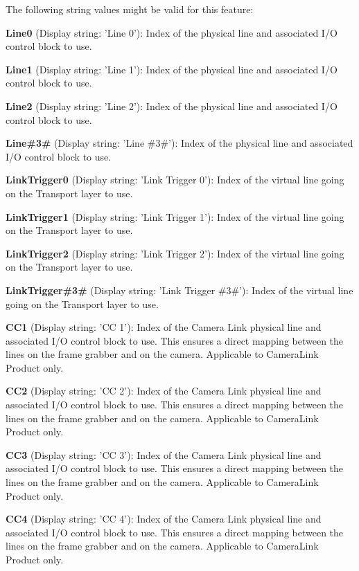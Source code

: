The following string values might be valid for this feature\+:
\begin{DoxyItemize}
\item {\bfseries Line0} (Display string\+: 'Line 0')\+: Index of the physical line and associated I/\+O control block to use.
\item {\bfseries Line1} (Display string\+: 'Line 1')\+: Index of the physical line and associated I/\+O control block to use.
\item {\bfseries Line2} (Display string\+: 'Line 2')\+: Index of the physical line and associated I/\+O control block to use.
\item {\bfseries Line\#3\#} (Display string\+: 'Line \#3\#')\+: Index of the physical line and associated I/\+O control block to use.
\item {\bfseries Link\+Trigger0} (Display string\+: 'Link Trigger 0')\+: Index of the virtual line going on the Transport layer to use.
\item {\bfseries Link\+Trigger1} (Display string\+: 'Link Trigger 1')\+: Index of the virtual line going on the Transport layer to use.
\item {\bfseries Link\+Trigger2} (Display string\+: 'Link Trigger 2')\+: Index of the virtual line going on the Transport layer to use.
\item {\bfseries Link\+Trigger\#3\#} (Display string\+: 'Link Trigger \#3\#')\+: Index of the virtual line going on the Transport layer to use.
\item {\bfseries C\+C1} (Display string\+: 'C\+C 1')\+: Index of the Camera Link physical line and associated I/\+O control block to use. This ensures a direct mapping between the lines on the frame grabber and on the camera. Applicable to Camera\+Link Product only.
\item {\bfseries C\+C2} (Display string\+: 'C\+C 2')\+: Index of the Camera Link physical line and associated I/\+O control block to use. This ensures a direct mapping between the lines on the frame grabber and on the camera. Applicable to Camera\+Link Product only.
\item {\bfseries C\+C3} (Display string\+: 'C\+C 3')\+: Index of the Camera Link physical line and associated I/\+O control block to use. This ensures a direct mapping between the lines on the frame grabber and on the camera. Applicable to Camera\+Link Product only.
\item {\bfseries C\+C4} (Display string\+: 'C\+C 4')\+: Index of the Camera Link physical line and associated I/\+O control block to use. This ensures a direct mapping between the lines on the frame grabber and on the camera. Applicable to Camera\+Link Product only.

\end{DoxyItemize}
